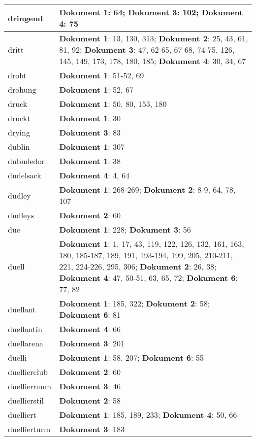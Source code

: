 \documentclass[a5paper]{article}
\begin{document}
\begin{longtable}[l]{|l|p{3in}|}
\hline
dringend & \textbf{Dokument 1}: 64; \textbf{Dokument 3}: 102; \textbf{Dokument 4}: 75 \\
\hline
dritt & \textbf{Dokument 1}: 13, 130, 313; \textbf{Dokument 2}: 25, 43, 61, 81, 92; \textbf{Dokument 3}: 47, 62-65, 67-68, 74-75, 126, 145, 149, 173, 178, 180, 185; \textbf{Dokument 4}: 30, 34, 67 \\
\hline
droht & \textbf{Dokument 1}: 51-52, 69 \\
\hline
drohung & \textbf{Dokument 1}: 52, 67 \\
\hline
druck & \textbf{Dokument 1}: 50, 80, 153, 180 \\
\hline
druckt & \textbf{Dokument 1}: 30 \\
\hline
drying & \textbf{Dokument 3}: 83 \\
\hline
dublin & \textbf{Dokument 1}: 307 \\
\hline
dubmledor & \textbf{Dokument 1}: 38 \\
\hline
dudelsack & \textbf{Dokument 4}: 4, 64 \\
\hline
dudley & \textbf{Dokument 1}: 268-269; \textbf{Dokument 2}: 8-9, 64, 78, 107 \\
\hline
dudleys & \textbf{Dokument 2}: 60 \\
\hline
due & \textbf{Dokument 1}: 228; \textbf{Dokument 3}: 56 \\
\hline
duell & \textbf{Dokument 1}: 1, 17, 43, 119, 122, 126, 132, 161, 163, 180, 185-187, 189, 191, 193-194, 199, 205, 210-211, 221, 224-226, 295, 306; \textbf{Dokument 2}: 26, 38; \textbf{Dokument 4}: 47, 50-51, 63, 65, 72; \textbf{Dokument 6}: 77, 82 \\
\hline
duellant & \textbf{Dokument 1}: 185, 322; \textbf{Dokument 2}: 58; \textbf{Dokument 6}: 81 \\
\hline
duellantin & \textbf{Dokument 4}: 66 \\
\hline
duellarena & \textbf{Dokument 3}: 201 \\
\hline
duelli & \textbf{Dokument 1}: 58, 207; \textbf{Dokument 6}: 55 \\
\hline
duellierclub & \textbf{Dokument 2}: 60 \\
\hline
duellierraum & \textbf{Dokument 3}: 46 \\
\hline
duellierstil & \textbf{Dokument 2}: 58 \\
\hline
duelliert & \textbf{Dokument 1}: 185, 189, 233; \textbf{Dokument 4}: 50, 66 \\
\hline
duellierturm & \textbf{Dokument 3}: 183 \\

\end{longtable}
\end{document}
